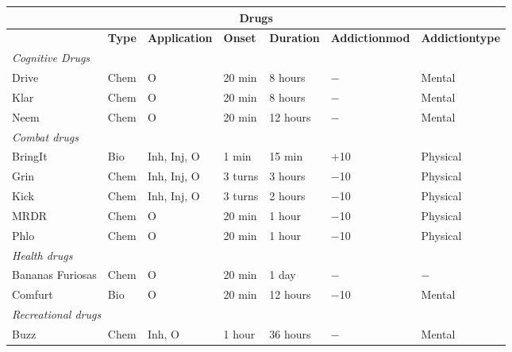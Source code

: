 \begin{table} \begin{tabularx}{\textwidth}{|X|l|l|l|l|X|X|} \hline

\multicolumn{7}{|c|}{\textbf{Drugs}}	\\ \hline

&\textbf{Type}	&\textbf{Application}	&\textbf{Onset}	&\textbf{Duration}	&\textbf{Addiction\newline mod}	&\textbf{Addiction\newline type} \\ \hline

\multicolumn{7}{|l|}{\emph{Cognitive Drugs}}	\\ \hline

Drive	&Chem	&O	&20 min &8 hours	&$-$	&Mental	\\ \hline

Klar	&Chem	&O	&20 min	&8 hours	&$-$	&Mental	\\ \hline

Neem	&Chem	&O	&20 min	&12 hours	&$-$	&Mental	\\ \hline

\multicolumn{7}{|l|}{\emph{Combat drugs}}	\\ \hline

BringIt	&Bio	&Inh, Inj, O	&1 min	&15 min	&+10	&Physical	\\ \hline

Grin	&Chem	&Inh, Inj, O	&3 turns	&3 hours	&$-$10	&Physical	\\ \hline

Kick	&Chem	&Inh, Inj, O	&3 turns	&2 hours	&$-$10	&Physical	\\ \hline

MRDR	&Chem	&O	&20 min	&1 hour	&$-$10	&Physical	\\ \hline

Phlo	&Chem	&O	&20 min	&1 hour	&$-$10	&Physical	\\ \hline

\multicolumn{7}{|l|}{\emph{Health drugs}}	\\ \hline

Bananas Furiosas	&Chem	&O	&20 min	&1 day	&$-$	&$-$	\\ \hline

Comfurt	&Bio	&O	&20 min	&12 hours	&$-$10	&Mental	\\ \hline

\multicolumn{7}{|l|}{\emph{Recreational drugs}}	\\ \hline

Buzz	&Chem	&Inh, O	&1 hour	&36 hours	&$-$	&Mental	\\ \hline


\end{tabularx}
\end{table}
